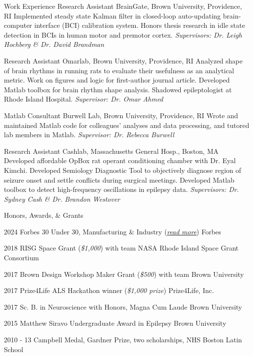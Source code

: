 \documentclass{FormatCV}
\begin{document}
\begin{newSection}{Work Experience}
{Research Assistant}
{BrainGate, Brown University, Providence, RI}
{Implemented steady state Kalman filter in closed-loop auto-updating brain-computer interface (BCI) calibration system. Honors thesis research in idle state detection in BCIs in human motor and premotor cortex. \emph{Supervisors: Dr. Leigh Hochberg \& Dr. David Brandman}}
	
{Research Assistant}
{Omarlab, Brown University, Providence, RI}
{Analyzed shape of brain rhythms in running rats to evaluate their usefulness as an analytical metric. Work on figures and logic for first-author journal article. Developed Matlab toolbox for brain rhythm shape analysis. Shadowed epileptologist at Rhode Island Hospital. \emph{Supervisor: Dr. Omar Ahmed}}

{Matlab Consultant}
{Burwell Lab, Brown University, Providence, RI}
{Wrote and maintained Matlab code for colleagues' analyses and data processing, and tutored lab members in Matlab. \emph{Supervisor: Dr. Rebecca Burwell}}

{Research Assistant}
{Cashlab, Massachusetts General Hosp., Boston, MA}
{Developed affordable OpBox rat operant conditioning chamber with Dr. Eyal Kimchi. Developed Semiology Diagnostic Tool to objectively diagnose region of seizure onset and settle conflicts during surgical meetings. Developed Matlab toolbox to detect high-frequency oscillations in epilepsy data. \emph{Supervisors: Dr. Sydney Cash \& Dr. Brandon Westover}}

\end{newSection}


\begin{newSection}{Honors, Awards, \& Grants}

\three
{2024}
{Forbes 30 Under 30, Manufacturing \& Industry (\emph{\href{https://www.forbes.com/profile/senra-systems}{read more}})}
{Forbes}

\three
{2018}
{RISG Space Grant (\emph{\$1,000}) with team}
{NASA Rhode Island Space Grant Consortium}

\three
{2017}
{Brown Design Workshop Maker Grant (\emph{\$500}) with team}
{Brown University}

\three
{2017}
{Prize4Life ALS Hackathon winner (\emph{\$1,000 prize})}
{Prize4Life, Inc.}

\three
{2017}
{Sc. B. in Neuroscience with Honors, Magna Cum Laude}
{Brown University}

\three
{2015} 
{Matthew Siravo Undergraduate Award in Epilepsy}
{Brown University}

\three
{2010 - 13}
{Campbell Medal, Gardner Prize, two scholarships, NHS}
{Boston Latin School}

\end{newSection}
\end{document}
